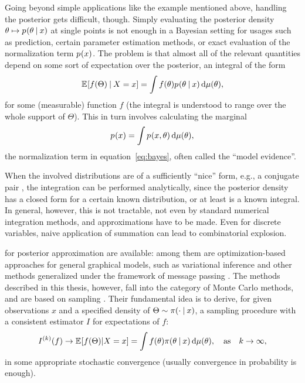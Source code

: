 Going beyond simple applications like the example mentioned above, hand\-ling the posterior gets
difficult, though.  Simply evaluating the posterior density
\(\theta \mapsto \prob{\theta \given x}\) at single points is not enough in a Bayesian setting for
usages such as prediction, certain parameter estimation methods, or exact evaluation of the
normalization term \(\prob{x}\).  The problem is that almost all of the relevant quantities depend
on some sort of expectation over the posterior, an integral of the form
\begin{equation}
  \label{eq:posterior-expectation}
  \Exp{f(\Theta) \given X = x} = \int f(\theta) \prob{\theta \given x} \dif \mu(\theta),
\end{equation}
for some (measurable) function \(f\) (the integral is understood to range over the whole support of
\(\Theta\)). This in turn involves calculating the marginal
\begin{equation}
  \label{eq:normalizing}
  \prob{x} = \int \prob{x, \theta} \dif \mu(\theta),
\end{equation}
the normalization term in equation~\eqref{eq:bayes}, often called the \enquote{model evidence}.

When the involved distributions are of a sufficiently \enquote{nice} form, e.g., a conjugate pair
\parencites[see][chapter 2.2.2]{marin2007bayesian}[chapter 9.2.5]{murphy2012machine}, the
integration can be performed analytically, since the posterior density has a closed form for a
certain known distribution, or at least is a known integral.  In general, however, this is not
tractable, not even by standard numerical integration methods, and approximations have to be made.
Even for discrete variables, naive application of summation can lead to combinatorial explosion.

 for posterior approximation are available: among them are
optimization-based approaches for general graphical models, such as variational inference
\parencite[chapter 21 and 22]{murphy2012machine} and other methods generalized under the framework
of message passing \parencite{minka2005divergence}.  The methods described in this thesis, however,
fall into the category of Monte Carlo methods, and are based on sampling \parencites[chapter
23]{murphy2012machine}{vihola2020lectures}.  Their fundamental idea is to derive, for given
observations \(x\) and a specified density of \(\Theta \sim \pi(\cdot \:\vert\: x)\), a sampling
procedure with a consistent estimator \(I\) for expectations of \(f\):
\begin{equation}
  \label{eq:mc-methods}
  \kth{I}(f) \to \Exp{f(\Theta) | X = x} = \int f(\theta) \pi(\theta \given x) \dif\mu(\theta),
  \quad \text{as} \quad k \to \infty,
\end{equation}
in some appropriate stochastic convergence (usually convergence in probability is enough).

